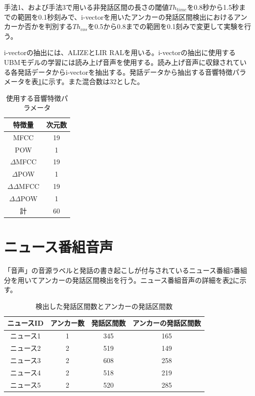 手法1、および手法3で用いる非発話区間の長さの閾値$Th_{time}$を0.8秒から1.5秒までの範囲を0.1秒刻みで、i-vectorを用いたアンカーの発話区間検出におけるアンカーか否かを判別する$Th_{cos}$を0.5から0.8までの範囲を0.1刻みで変更して実験を行う。\par
i-vectorの抽出には、ALIZEとLIR RAL\cite{alize}を用いる。i-vectorの抽出に使用するUBMモデルの学習には読み上げ音声\cite{ATR}を使用する。読み上げ音声に収録されている各発話データからi-vectorを抽出する。発話データから抽出する音響特徴パラメータを表\ref{iv_feature2}に示す。また混合数は32とした。\par

\begin{table}[H]
  \begin{center}
    \caption{使用する音響特徴パラメータ \label{iv_feature2}}
    \begin{tabular}{|c||c|} \hline
      特徴量 & 次元数\\ \hline
      MFCC & 19  \\ 
      POW & 1  \\ 
      $\Delta$MFCC & 19 \\ 
      $\Delta$POW & 1 \\ 
      $\Delta\Delta$MFCC & 19 \\ 
      $\Delta\Delta$POW & 1 \\ \hline
      計 & 60 \\ \hline
    \end{tabular}
  \end{center}
\end{table}

\section{ニュース番組音声}
「音声」の音源ラベルと発話の書き起こしが付与されているニュース番組5番組分を用いてアンカーの発話区間検出を行う。ニュース番組音声の詳細を表\ref{table:num_of_anchor}に示す。

\begin{table}[H]
  \begin{center}
    \caption{検出した発話区間数とアンカーの発話区間数 \label{table:num_of_anchor}}
    \begin{tabular}{|c||c|c|c|} \hline
ニュースID & アンカー数 & 発話区間数 & アンカーの発話区間数 \\ \hline
ニュース1  & 1 & 345   & 165 \\ \hline
ニュース2  & 2 & 519   & 149 \\ \hline
ニュース3  & 2 & 608   & 258 \\ \hline
ニュース4  & 2 & 518   & 219 \\ \hline
ニュース5  & 2 & 520   & 285 \\ \hline
    \end{tabular}
  \end{center}
\end{table}

